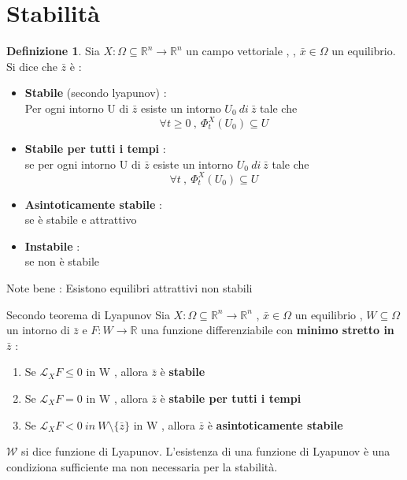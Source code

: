 \documentclass{article}
\theoremstyle{definition}
\newtheorem{definizione}{Definizione}[section]
\newcommand{\R}{\mathbb{R}}
\newcommand{\Rn}{\R^n}
\begin{document}
 		 	\section{Stabilità}
 		 	\begin{definizione}
 		 		Sia $X : \Omega \subseteq \Rn \rightarrow \Rn$ un campo vettoriale , , $\bar{x} \in \Omega$ un equilibrio. \\
 		 		Si dice che $\bar{z}$ è : 
 		 		\begin{itemize}
 		 			\item \textbf{Stabile} (secondo lyapunov) :  \\
 		 			Per ogni intorno U di $\bar{z}$  esiste un intorno $U_0 \ di \ \bar{z}$ tale che 
 		 			$$ \forall t \geq 0  \ , \ \Phi^X_t(U_0) \subseteq U $$
 		 			\item \textbf{Stabile per tutti i tempi} : \\
 		 			se per ogni intorno U di $\bar{z}$  esiste un intorno $U_0 \ di \ \bar{z}$ tale che 
 		 			$$ \forall t  \ , \ \Phi^X_t(U_0) \subseteq U $$
 		 			\item \textbf{Asintoticamente stabile} : \\se è stabile e attrattivo
 		 			\item \textbf{Instabile} : \\
 		 			se non è stabile 
 		 		\end{itemize} 
 		 	\end{definizione}
 		 	Note bene : Esistono equilibri attrattivi non stabili 
\begin{teo}{Secondo teorema di Lyapunov}{}{}
Sia  $X : \Omega \subseteq \Rn \rightarrow \Rn$ ,  $\bar{x} \in \Omega$ un equilibrio , $W \subseteq \Omega $ un intorno di $\bar{z}$ e $F : W \rightarrow \R$ una funzione differenziabile con \textbf{minimo stretto in $\bar{z}$} : 
\begin{enumerate}
\item Se $\mathcal{L}_X F \leq 0$ in W , allora $\bar{z}$ è \textbf{stabile}
\item Se $\mathcal{L}_X F = 0$ in W , allora $\bar{z}$ è \textbf{stabile per tutti i tempi}
\item Se $\mathcal{L}_X F < 0  \ in \ W \setminus \{\bar{z}\}$ in W , allora $\bar{z}$ è \textbf{asintoticamente stabile}
\end{enumerate}
$\mathcal{W}$ si dice funzione di Lyapunov. L'esistenza di una funzione di Lyapunov è una condiziona sufficiente ma non necessaria per la stabilità. 
 \end{teo}
\end{document}
